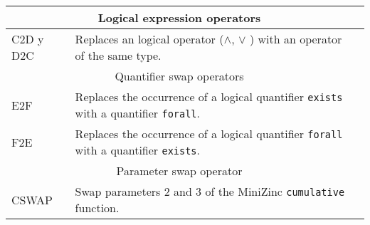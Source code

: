 \begin{table*}[htb!]
\begin{tabular}{l p{}r}
     \midrule
     \multicolumn{2}{c}{Logical expression operators} \\
     \midrule
     C2D y  D2C & Replaces an logical operator ($\wedge$, $\vee$ ) with an operator of the same type.\\
     \midrule
     \multicolumn{2}{c}{Quantifier swap operators} \\
      \midrule
      E2F & Replaces the occurrence of a logical quantifier \texttt{exists}  with a quantifier \texttt{forall}.\\
      F2E & Replaces the occurrence of a logical quantifier \texttt{forall} with a quantifier  \texttt{exists}.\\
     \midrule
      \multicolumn{2}{c}{Parameter swap operator} \\
     \midrule
     CSWAP & Swap parameters 2 and 3 of the MiniZinc \texttt{cumulative} function. \\
    \bottomrule
    \end{tabular}
    \end{table*}

%

